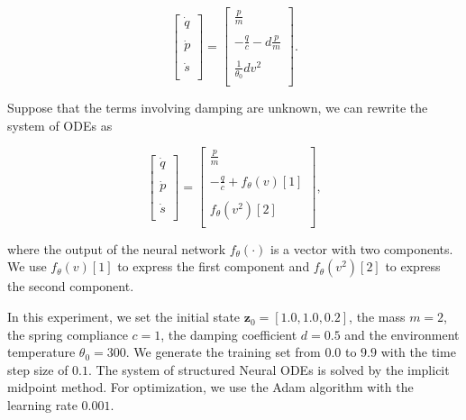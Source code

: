 \documentclass[
	parskip, 			   %
	twoside, 			   %
	DIV=14, 			   %
	BCOR=15.0mm, 		   %
	headsepline, 		   %
	open=right, 		   %
	captions=tableheading, %
	bibliography=totoc,    %
	numbers=noenddot       %
]{scrreprt}
\begin{document}
\begin{equation}
    \label{eq:ODE_idho}
    \begin{bmatrix}
    \dot{q}\\
    \\
    \dot{p}\\
    \\
    \dot{s}\\
    \end{bmatrix}
    =
    \begin{bmatrix}
    \frac{p}{m}\\
    \\
    -\frac{q}{c}-d\frac{p}{m}\\
    \\
    \frac{1}{\theta_{0}} d v^2\\
    \end{bmatrix}.
\end{equation}

Suppose that the terms involving damping are unknown, we can rewrite the system of ODEs as

\begin{equation}
    \label{eq:NeuralODE_idho}
    \begin{bmatrix}
    \dot{q}\\
    \\
    \dot{p}\\
    \\
    \dot{s}\\
    \end{bmatrix}
    =
    \begin{bmatrix}
    \frac{p}{m}\\
    \\
    -\frac{q}{c} + f_{\theta}(v)[1]\\
    \\
    f_{\theta}(v^2)[2]\\
    \end{bmatrix},
\end{equation}

where the output of the neural network $f_{\theta}(\cdot)$ is a vector with two components. We use $f_{\theta}(v)[1]$ to express the first component and $f_{\theta}(v^2)[2]$ to express the second component.

In this experiment, we set the initial state $\mathbf{z}_0 = [1.0, 1.0, 0.2]$, the mass $m = 2$, the spring compliance $c = 1$, the damping coefficient $d=0.5$ and the environment temperature $\theta_0=300$. We generate the training set from $0.0$ to $9.9$ with the time step size of $0.1$. The system of structured Neural ODEs is solved by the implicit midpoint method. For optimization, we use the Adam algorithm with the learning rate $0.001$.
\end{document}
